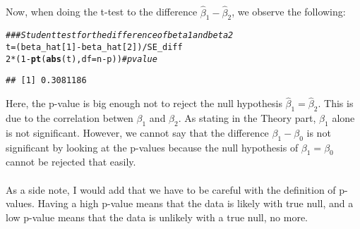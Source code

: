 \documentclass[11pt]{article}\usepackage[]{graphicx}\usepackage[]{color}
\makeatletter
\newcommand{\hlnum}[1]{\textcolor[rgb]{0.686,0.059,0.569}{#1}}%
\newcommand{\hlcom}[1]{\textcolor[rgb]{0.678,0.584,0.686}{\textit{#1}}}%
\newcommand{\hlopt}[1]{\textcolor[rgb]{0,0,0}{#1}}%
\newcommand{\hlstd}[1]{\textcolor[rgb]{0.345,0.345,0.345}{#1}}%
\newcommand{\hlkwb}[1]{\textcolor[rgb]{0.69,0.353,0.396}{#1}}%
\newcommand{\hlkwc}[1]{\textcolor[rgb]{0.333,0.667,0.333}{#1}}%
\newcommand{\hlkwd}[1]{\textcolor[rgb]{0.737,0.353,0.396}{\textbf{#1}}}%
\newenvironment{kframe}{%
 \def\at@end@of@kframe{}%
 \ifinner\ifhmode%
  \def\at@end@of@kframe{\end{minipage}}%
  \begin{minipage}{\columnwidth}%
 \fi\fi%
 \def\FrameCommand##1{\hskip\@totalleftmargin \hskip-\fboxsep
 \colorbox{shadecolor}{##1}\hskip-\fboxsep
     \hskip-\linewidth \hskip-\@totalleftmargin \hskip\columnwidth}%
 \MakeFramed {\advance\hsize-\width
   \@totalleftmargin\z@ \linewidth\hsize
   \@setminipage}}%
 {\par\unskip\endMakeFramed%
 \at@end@of@kframe}
\newenvironment{knitrout}{}{} %
\makeatother
\begin{document}
\subsection{}
Now, when doing the t-test to the difference $\hat{\beta}_1 - \hat{\beta}_2$, we observe the following:
\begin{knitrout}
\color{fgcolor}\begin{kframe}
\begin{alltt}
\hlcom{## # Student test for the difference of beta 1 and beta 2}
\hlstd{t} \hlkwb{=} \hlstd{(beta_hat[}\hlnum{1}\hlstd{]}\hlopt{-}\hlstd{beta_hat[}\hlnum{2}\hlstd{])}\hlopt{/}\hlstd{SE_diff}
\hlnum{2}\hlopt{*}\hlstd{(}\hlnum{1}\hlopt{-}\hlkwd{pt}\hlstd{(}\hlkwd{abs}\hlstd{(t),}\hlkwc{df}\hlstd{=n}\hlopt{-}\hlstd{p))} \hlcom{#pvalue}
\end{alltt}
\begin{verbatim}
## [1] 0.3081186
\end{verbatim}
\end{kframe}
\end{knitrout}
Here, the p-value is big enough not to reject the null hypothesis $\hat{\beta}_1 = \hat{\beta}_2$. This is due to the correlation betwen $\beta_1$ and $\beta_2$.
As stating in the Theory part, $\beta_1$ alone is not significant. However, we cannot say that the difference $\beta_1-\beta_0$ is not significant by looking at the p-values because the null hypothesis of $\beta_1=\beta_0$ cannot be rejected that easily.\\\\
As a side note, I would add that we have to be careful with the definition of p-values. Having a high p-value means that the data is likely with true null, and a low p-value means that the data is unlikely with a true null, no more.
\end{document}
